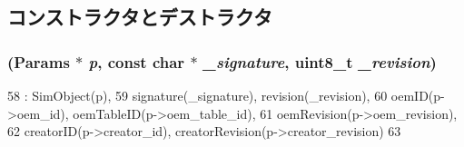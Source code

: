 \subsection{コンストラクタとデストラクタ}
\hypertarget{classX86ISA_1_1ACPI_1_1SysDescTable_a04eab68a8eb0bb71949b6e65354a1f0c}{
\subsubsection[{SysDescTable}]{ ({\bf Params} $\ast$ {\em p}, \/  const char $\ast$ {\em \_\-signature}, \/  uint8\_\-t {\em \_\-revision})}}
\label{classX86ISA_1_1ACPI_1_1SysDescTable_a04eab68a8eb0bb71949b6e65354a1f0c}



\begin{DoxyCode}
58                                                     : SimObject(p),
59     signature(_signature), revision(_revision),
60     oemID(p->oem_id), oemTableID(p->oem_table_id),
61     oemRevision(p->oem_revision),
62     creatorID(p->creator_id), creatorRevision(p->creator_revision)
63 {}
\end{DoxyCode}


